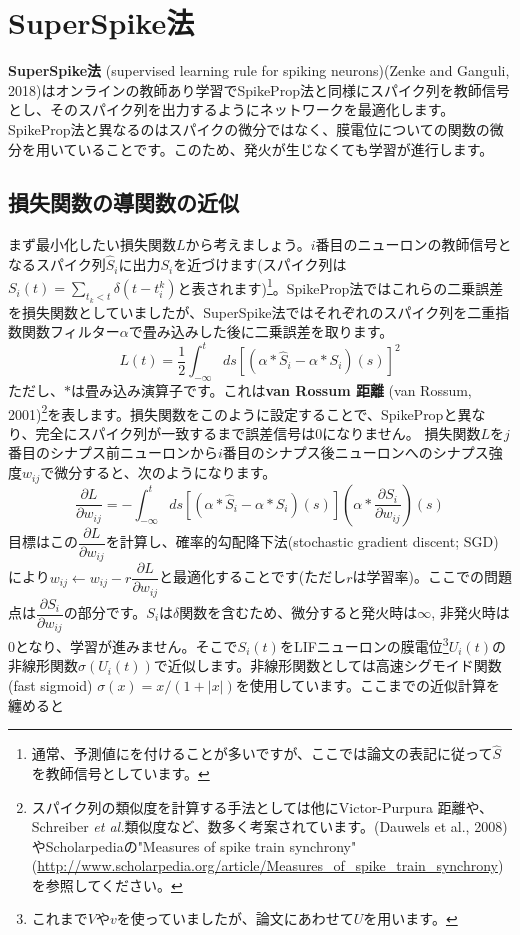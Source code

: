\section{SuperSpike法}
\textbf{SuperSpike法} (supervised learning rule for spiking neurons)(Zenke and Ganguli, 2018)はオンラインの教師あり学習でSpikeProp法と同様にスパイク列を教師信号とし、そのスパイク列を出力するようにネットワークを最適化します。SpikeProp法と異なるのはスパイクの微分ではなく、膜電位についての関数の微分を用いていることです。このため、発火が生じなくても学習が進行します。
\subsection{損失関数の導関数の近似}
まず最小化したい損失関数$L$から考えましょう。$i$番目のニューロンの教師信号となるスパイク列$\hat{S}_{i}$に出力${S}_{i}$を近づけます(スパイク列は$S_i(t)=\sum_{t_{k}< t} \delta\left(t-t_i^{k}\right)$と表されます)\footnote{通常、予測値に$\hat{}$を付けることが多いですが、ここでは論文の表記に従って$\hat{S}$を教師信号としています。}。SpikeProp法ではこれらの二乗誤差を損失関数としていましたが、SuperSpike法ではそれぞれのスパイク列を二重指数関数フィルター$\alpha$で畳み込みした後に二乗誤差を取ります。
\begin{equation}
L(t)=\frac{1}{2} \int_{-\infty}^{t} d s\left[\left(\alpha * \hat{S}_{i}-\alpha * S_{i}\right)(s)\right]^{2}
\end{equation}
ただし、$*$は畳み込み演算子です。これは\textbf{van Rossum 距離} (van Rossum, 2001)\footnote{スパイク列の類似度を計算する手法としては他にVictor-Purpura 距離や、 Schreiber \textit{et al.}類似度など、数多く考案されています。(Dauwels et al., 2008)やScholarpediaの"Measures of spike train synchrony"(\url{http://www.scholarpedia.org/article/Measures_of_spike_train_synchrony})を参照してください。}を表します。損失関数をこのように設定することで、SpikePropと異なり、完全にスパイク列が一致するまで誤差信号は0になりません。
損失関数$L$を$j$番目のシナプス前ニューロンから$i$番目のシナプス後ニューロンへのシナプス強度$w_{ij}$で微分すると、次のようになります。
\begin{equation}
\frac{\partial L}{\partial w_{i j}}=-\int_{-\infty}^{t} d s\left[\left(\alpha * \hat{S}_{i}-\alpha * S_{i}\right)(s)\right]\left(\alpha * \frac{\partial S_{i}}{\partial w_{i j}}\right)(s)    
\end{equation}
目標はこの$\dfrac{\partial L}{\partial w_{i j}}$を計算し、確率的勾配降下法(stochastic gradient discent; SGD)により$w_{ij}\leftarrow w_{ij}-r \dfrac{\partial L}{\partial w_{i j}}$と最適化することです(ただし$r$は学習率)。ここでの問題点は$\dfrac{\partial S_{i}}{\partial w_{i j}}$の部分です。$S_i$は$\delta$関数を含むため、微分すると発火時は$\infty$, 非発火時は0となり、学習が進みません。そこで$S_i(t)$をLIFニューロンの膜電位\footnote{これまで$V$や$v$を使っていましたが、論文にあわせて$U$を用います。}$U_i(t)$の非線形関数$\sigma(U_i(t))$で近似します。非線形関数としては高速シグモイド関数(fast sigmoid) $\sigma(x)=x/(1+|x|)$を使用しています。ここまでの近似計算を纏めると
